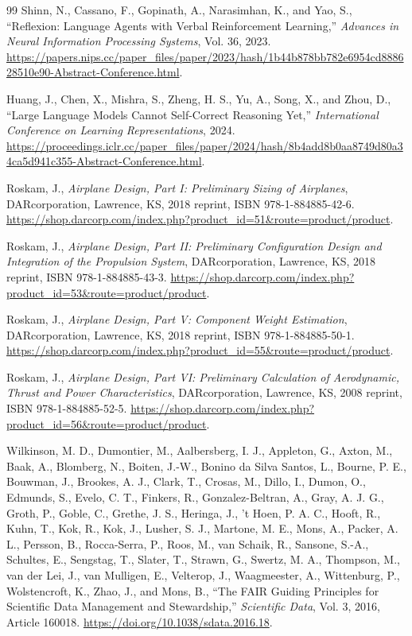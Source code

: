 \documentclass[10pt,letterpaper]{article}
\begin{document}
\begin{thebibliography}{99}
 Shinn, N., Cassano, F., Gopinath, A., Narasimhan, K., and Yao, S., ``Reflexion: Language Agents with Verbal Reinforcement Learning,'' \emph{Advances in Neural Information Processing Systems}, Vol. 36, 2023. \url{https://papers.nips.cc/paper_files/paper/2023/hash/1b44b878bb782e6954cd888628510e90-Abstract-Conference.html}.

 Huang, J., Chen, X., Mishra, S., Zheng, H. S., Yu, A., Song, X., and Zhou, D., ``Large Language Models Cannot Self-Correct Reasoning Yet,'' \emph{International Conference on Learning Representations}, 2024. \url{https://proceedings.iclr.cc/paper_files/paper/2024/hash/8b4add8b0aa8749d80a34ca5d941c355-Abstract-Conference.html}.

 Roskam, J., \emph{Airplane Design, Part I: Preliminary Sizing of Airplanes}, DARcorporation, Lawrence, KS, 2018 reprint, ISBN 978-1-884885-42-6. \url{https://shop.darcorp.com/index.php?product_id=51&route=product/product}.

 Roskam, J., \emph{Airplane Design, Part II: Preliminary Configuration Design and Integration of the Propulsion System}, DARcorporation, Lawrence, KS, 2018 reprint, ISBN 978-1-884885-43-3. \url{https://shop.darcorp.com/index.php?product_id=53&route=product/product}.

 Roskam, J., \emph{Airplane Design, Part V: Component Weight Estimation}, DARcorporation, Lawrence, KS, 2018 reprint, ISBN 978-1-884885-50-1. \url{https://shop.darcorp.com/index.php?product_id=55&route=product/product}.

 Roskam, J., \emph{Airplane Design, Part VI: Preliminary Calculation of Aerodynamic, Thrust and Power Characteristics}, DARcorporation, Lawrence, KS, 2008 reprint, ISBN 978-1-884885-52-5. \url{https://shop.darcorp.com/index.php?product_id=56&route=product/product}.

 Wilkinson, M. D., Dumontier, M., Aalbersberg, I. J., Appleton, G., Axton, M., Baak, A., Blomberg, N., Boiten, J.-W., Bonino da Silva Santos, L., Bourne, P. E., Bouwman, J., Brookes, A. J., Clark, T., Crosas, M., Dillo, I., Dumon, O., Edmunds, S., Evelo, C. T., Finkers, R., Gonzalez-Beltran, A., Gray, A. J. G., Groth, P., Goble, C., Grethe, J. S., Heringa, J., 't Hoen, P. A. C., Hooft, R., Kuhn, T., Kok, R., Kok, J., Lusher, S. J., Martone, M. E., Mons, A., Packer, A. L., Persson, B., Rocca-Serra, P., Roos, M., van Schaik, R., Sansone, S.-A., Schultes, E., Sengstag, T., Slater, T., Strawn, G., Swertz, M. A., Thompson, M., van der Lei, J., van Mulligen, E., Velterop, J., Waagmeester, A., Wittenburg, P., Wolstencroft, K., Zhao, J., and Mons, B., ``The FAIR Guiding Principles for Scientific Data Management and Stewardship,'' \emph{Scientific Data}, Vol. 3, 2016, Article 160018. \url{https://doi.org/10.1038/sdata.2016.18}.


\end{thebibliography}
\end{document}
